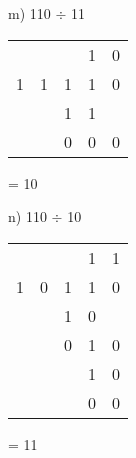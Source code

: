 \begin{figure}[H]
    \begin{minipage}[t]{0.45\textwidth}
        m) 110 $\div$ 11
        \begin{table}[H]
            \centering
            \begin{tabularx}{0.5\linewidth}{XXXXX}
                & & & 1 & 0 \\
                \cline{3-5}
                1 & 1 & \multicolumn{1}{|X}{1} & 1 & 0 \\
                & & 1 & 1 &  \\
                \cline{3-4}
                & & 0 & 0 & 0 \\
            \end{tabularx}
        \end{table}
        = 10
    \end{minipage}\hfill
    \begin{minipage}[t]{0.45\textwidth}
        n) 110 $\div$ 10
        \begin{table}[H]
            \centering
            \begin{tabularx}{0.5\linewidth}{XXXXX}
                & & & 1 & 1 \\
                \cline{3-5}
                1 & 0 & \multicolumn{1}{|X}{1} & 1 & 0 \\
                & & 1 & 0 &  \\
                \cline{3-4}
                & & 0 & 1 & 0\\
                & & & 1 & 0\\
                \cline{4-5}
                & &  & 0 & 0 \\
            \end{tabularx}
        \end{table}
        = 11
    \end{minipage}\hfill
\end{figure}

